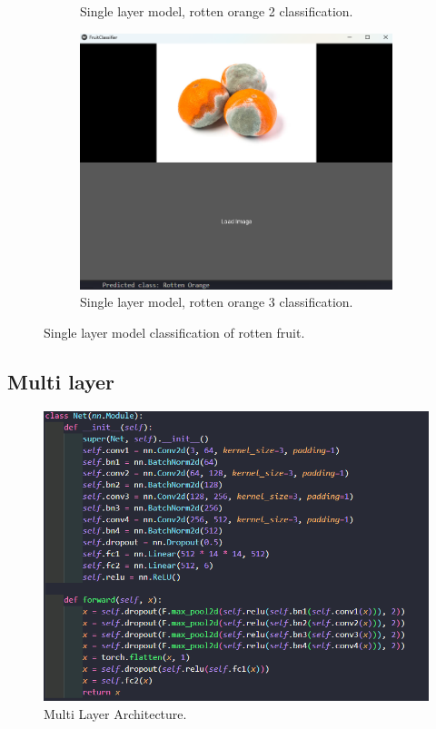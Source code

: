 \documentclass[conference]{IEEEtran}
\begin{document}
\begin{figure}[h]
\begin{subfigure}[b]{0.48\linewidth}
        \caption{Single layer model, rotten orange 2 classification.}
        \label{figFB}
    \end{subfigure}
    \hfill
    \begin{subfigure}[b]{0.48\linewidth}
        \centering
        \includegraphics[width=\linewidth]{1layer orageR3.png}
        \caption{Single layer model, rotten orange 3 classification.}
        \label{figFB}
    \end{subfigure}
    \caption{Single layer model classification of rotten fruit.}
    \label{Fig1R}
\end{figure}
\clearpage

\subsection{Multi layer}

\begin{figure}[h]
    \centering
    \includegraphics[width=\linewidth]{multi architecture.png}
    \caption{Multi Layer Architecture.}
    \label{figMl}
\end{figure}
\end{document}

